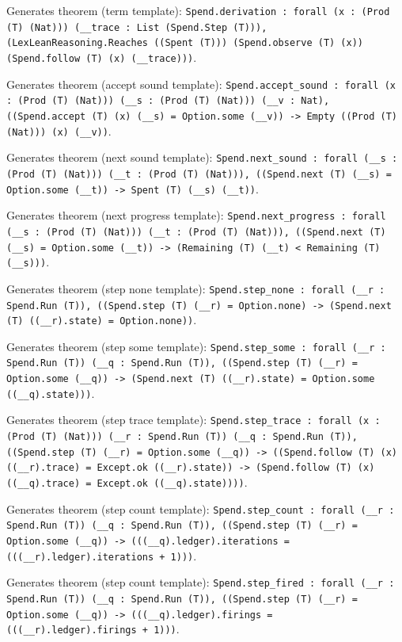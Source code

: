 \documentclass[11pt]{article}
\begin{document}
\noindent Generates theorem (term template): \texttt{Spend.derivation : forall (x : (Prod (T) (Nat))) (\_\_trace : List (Spend.Step (T))), (LexLeanReasoning.Reaches ((Spent (T))) (Spend.observe (T) (x)) (Spend.follow (T) (x) (\_\_trace)))}.\par
\noindent Generates theorem (accept sound template): \texttt{Spend.accept\_sound : forall (x : (Prod (T) (Nat))) (\_\_s : (Prod (T) (Nat))) (\_\_v : Nat), ((Spend.accept (T) (x) (\_\_s) = Option.some (\_\_v)) -> Empty ((Prod (T) (Nat))) (x) (\_\_v))}.\par
\noindent Generates theorem (next sound template): \texttt{Spend.next\_sound : forall (\_\_s : (Prod (T) (Nat))) (\_\_t : (Prod (T) (Nat))), ((Spend.next (T) (\_\_s) = Option.some (\_\_t)) -> Spent (T) (\_\_s) (\_\_t))}.\par
\noindent Generates theorem (next progress template): \texttt{Spend.next\_progress : forall (\_\_s : (Prod (T) (Nat))) (\_\_t : (Prod (T) (Nat))), ((Spend.next (T) (\_\_s) = Option.some (\_\_t)) -> (Remaining (T) (\_\_t) < Remaining (T) (\_\_s)))}.\par
\noindent Generates theorem (step none template): \texttt{Spend.step\_none : forall (\_\_r : Spend.Run (T)), ((Spend.step (T) (\_\_r) = Option.none) -> (Spend.next (T) ((\_\_r).state) = Option.none))}.\par
\noindent Generates theorem (step some template): \texttt{Spend.step\_some : forall (\_\_r : Spend.Run (T)) (\_\_q : Spend.Run (T)), ((Spend.step (T) (\_\_r) = Option.some (\_\_q)) -> (Spend.next (T) ((\_\_r).state) = Option.some ((\_\_q).state)))}.\par
\noindent Generates theorem (step trace template): \texttt{Spend.step\_trace : forall (x : (Prod (T) (Nat))) (\_\_r : Spend.Run (T)) (\_\_q : Spend.Run (T)), ((Spend.step (T) (\_\_r) = Option.some (\_\_q)) -> ((Spend.follow (T) (x) ((\_\_r).trace) = Except.ok ((\_\_r).state)) -> (Spend.follow (T) (x) ((\_\_q).trace) = Except.ok ((\_\_q).state))))}.\par
\noindent Generates theorem (step count template): \texttt{Spend.step\_count : forall (\_\_r : Spend.Run (T)) (\_\_q : Spend.Run (T)), ((Spend.step (T) (\_\_r) = Option.some (\_\_q)) -> (((\_\_q).ledger).iterations = (((\_\_r).ledger).iterations + 1)))}.\par
\noindent Generates theorem (step count template): \texttt{Spend.step\_fired : forall (\_\_r : Spend.Run (T)) (\_\_q : Spend.Run (T)), ((Spend.step (T) (\_\_r) = Option.some (\_\_q)) -> (((\_\_q).ledger).firings = (((\_\_r).ledger).firings + 1)))}.\par
\end{document}
